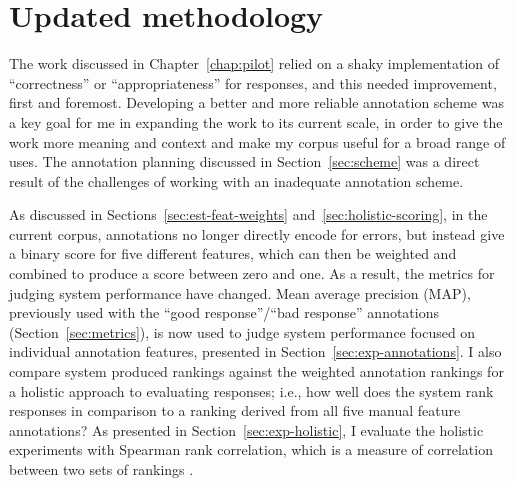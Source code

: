 \section{Updated methodology}
\label{sec:current-method}
The work discussed in Chapter~\ref{chap:pilot} relied on a shaky implementation of ``correctness'' or ``appropriateness'' for responses, and this needed improvement, first and foremost. Developing a better and more reliable annotation scheme was a key goal for me in expanding the work to its current scale, in order to give the work more meaning and context and make my corpus useful for a broad range of uses. The annotation planning discussed in Section~\ref{sec:scheme} was a direct result of the challenges of working with an inadequate annotation scheme. 

As discussed in Sections~\ref{sec:est-feat-weights} and~\ref{sec:holistic-scoring}, in the current corpus, annotations no longer directly encode for errors, but instead give a binary score for five different features, which can then be weighted and combined to produce a score between zero and one. As a result, the metrics for judging system performance have changed. Mean average precision (MAP), previously used with the ``good response''/``bad response'' annotations (Section~\ref{sec:metrics}), is now used to judge system performance focused on individual annotation features, presented in Section~\ref{sec:exp-annotations}. I also compare system produced rankings against the weighted annotation rankings for a holistic approach to evaluating responses; i.e., how well does the system rank responses in comparison to a ranking derived from all five manual feature annotations? As presented in Section~\ref{sec:exp-holistic}, I evaluate the holistic experiments with Spearman rank correlation, which is a measure of correlation between two sets of rankings \cite{dodge2008concise}.

